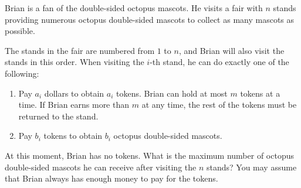 Brian is a fan of the double-sided octopus mascots.
He visits a fair with $n$ stands providing numerous octopus double-sided mascots to collect as many mascots as possible.

The stands in the fair are numbered from $1$ to $n$, and Brian will also visit the stands in this order.
When visiting the $i$-th stand, he can do exactly one of the following:
\begin{enumerate}
    \item Pay $a_i$ dollars to obtain $a_i$ tokens. Brian can hold at most $m$ tokens at a time. If Brian earns more than $m$ at any time, the rest of the tokens must be returned to the stand.
    \item Pay $b_i$ tokens to obtain $b_i$ octopus double-sided mascots.
\end{enumerate}
At this moment, Brian has no tokens.
What is the maximum number of octopus double-sided mascots he can receive after visiting the $n$ stands?
You may assume that Brian always has enough money to pay for the tokens.
